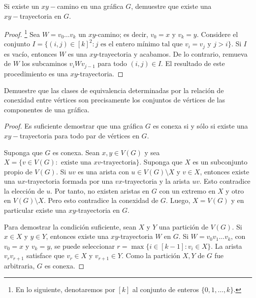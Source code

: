 \documentclass[12pt]{article}
\newenvironment{problem}[2][Problema]{\begin{trivlist}
\item[\hskip \labelsep {\bfseries #1}\hskip \labelsep {\bfseries #2.}]}{\end{trivlist}}
\begin{document}
\begin{problem}{3.1.1} Si existe un $xy-$camino en una gráfica $G$, demuestre que existe una \\ $xy-$trayectoria en $G.$
\end{problem}
\begin{proof} \footnote{En lo siguiente, denotaremos por $[k]$ al conjunto de enteros $\{0, 1, \ldots, k\}$.}
Sea $W = v_0 \ldots v_k$ un $xy$-camino; es decir, $v_0 = x$ y $v_k =y.$ Considere el conjunto $I = \{(i, j) \in [k]^2: j \text{ es el entero mínimo tal que } v_i = v_j \text{ y } j > i \}.$ Si $I$ es vacío, entonces $W$ es una $xy$-trayectoria y acabamos. De lo contrario, remueva de $W$ los subcaminos $v_{i}W v_{j-1}$ para todo $(i,j) \in I.$ El resultado de este procedimiento es una $xy$-trayectoria.
\end{proof}

\begin{problem}{3.1.3} Demuestre que las clases de equivalencia determinadas por la relación de conexidad entre vértices son precisamente los conjuntos de vértices de las componentes de una gráfica. 
\end{problem}
\begin{proof}
Es suficiente demostrar que una gráfica $G$ es conexa si y sólo si existe una $xy-$trayectoria para todo par de vértices en $G.$ 

Suponga que $G$ es conexa. Sean $x,y \in V(G)$ y sea $X = \{v \in V(G): \text{ existe una } xv\text{-trayectoria} \}$. Suponga que $X$ es un subconjunto propio de $V(G).$ Si $uv$ es una arista con $u\in V(G)\setminus X$ y $v \in X$, entonces existe una $ux$-trayectoria formada por una $vx$-trayectoria y la arista $uv.$ Esto contradice la elección de $u$. Por tanto, no existen aristas en $G$ con un extremo en $X$ y otro en $V(G)\setminus X$. Pero esto contradice la conexidad de $G$. Luego, $X = V(G)$ y en particular existe una $xy$-trayectoria en $G.$

Para demostrar la condición suficiente, sean $X$ y $Y$ una partición de $V(G).$ Si $x \in X$ y $y\in Y$, entonces existe una $xy$-trayectoria $W$ en $G$. Si $W = v_0 v_1 \ldots v_k$, con $v_0 = x$ y $v_k = y$, se puede seleccionar $r = \max\{i \in [k-1]: v_i \in X\}$. La arista $v_r v_{r+1}$ satisface que $v_r \in X$ y $v_{r+1} \in Y.$ Como la partición $X,Y$ de $G$ fue arbitraria, $G$ es conexa. 
\end{proof}
\end{document}
